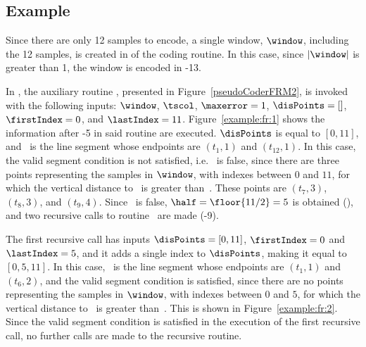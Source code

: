 \vspace{+10pt}





\clearpage
\subsection{Example}
\label{algo:fr:example}


\exampleIntro{\ref{example:fr:1}}


Since there are only 12 samples to encode, a single window, $\window$, including the 12 samples, is created in  of the coding routine. In this case, since $|\window|$ is greater than 1, the window is encoded in -13. 


In , the auxiliary routine \getDisplacedPointsMethod, presented in Figure~\ref{pseudoCoderFRM2}, is invoked with the following inputs: $\window$, $\tscol$, $\maxerror=1$, $\disPoints=[]$, $\firstIndex = 0$, and $\lastIndex = 11$. Figure~\ref{example:fr:1} shows the information after -5 in said routine are executed. $\disPoints$ is equal to $[0, 11]$, and \segment\ is the line segment whose endpoints are $(t_1, 1)$ and $(t_{12}, 1)$. In this case, the valid segment condition is not satisfied, i.e. \validSegment\ is false, since there are three points representing the samples in $\window$, with indexes between $0$ and $11$, for which the vertical distance to \segment\ is greater than~\maxerror. These points are $(t_7, 3)$, $(t_8, 3)$, and $(t_9, 4)$. Since \validSegment\ is false, $\half=\floor{11/2}=5$ is obtained (), and two recursive calls to routine \getDisplacedPointsMethod\ are made (-9).




The first recursive call has inputs $\disPoints=[0, 11]$, $\firstIndex = 0$ and $\lastIndex = 5$, and it adds a single index to $\disPoints$, making it equal to $[0, 5, 11]$. In this case, \segment\ is the line segment whose endpoints are $(t_1, 1)$ and $(t_{6}, 2)$, and the valid segment condition is satisfied, since there are no points representing the samples in $\window$, with indexes between $0$ and $5$, for which the vertical distance to \segment\ is greater than~\maxerror. This is shown in Figure~\ref{example:fr:2}. Since the valid segment condition is satisfied in the execution of the first recursive call, no further calls are made to the recursive routine.


